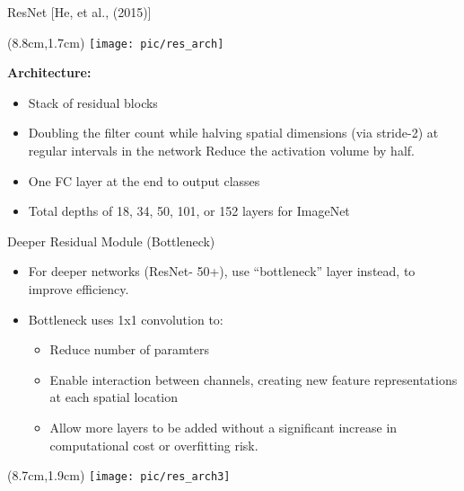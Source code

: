 \documentclass[serif, aspectratio=169]{beamer}
\begin{document}
\begin{frame}{ResNet [He, et al., (2015)]}
	\begin{textblock*}{5cm}(8.8cm,1.7cm) %
		\texttt{[image: pic/res\_arch]}
	\end{textblock*}
	\textbf{Architecture:}
	\begin{itemize}
		\item Stack of residual blocks
		\item Doubling the filter count while halving \newline spatial dimensions (via stride-2) at regular \newline intervals in the network Reduce the \newline activation volume by half.
		

		\item One FC layer at the end to output classes
		\item Total depths of 18, 34, 50, 101, or 152 \newline layers for ImageNet
	\end{itemize}
\end{frame}

\begin{frame}{Deeper Residual Module (Bottleneck)}
	\begin{itemize}
		\item For deeper networks (ResNet- 50+), use \newline ``bottleneck'' layer instead, to improve \newline efficiency.
		\item Bottleneck uses 1x1 convolution to:
		 \begin{itemize}
		 	\item Reduce number of paramters
		 	\item Enable interaction between channels, \newline creating new feature representations at \newline each spatial location
		 	\item Allow more layers to be added without \newline a significant increase in computational \newline cost or overfitting risk.
		 \end{itemize}
	\end{itemize}

	\begin{textblock*}{5cm}(8.7cm,1.9cm) %
		\texttt{[image: pic/res\_arch3]}
	\end{textblock*}
\end{frame}
\end{document}

